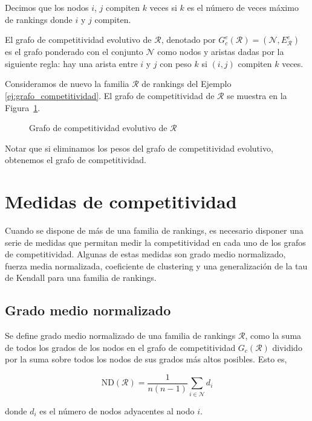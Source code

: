 \begin{defi}
Decimos que los nodos $i$, $j$ compiten $k$ veces si $k$ es el número de veces máximo de rankings donde $i$ y $j$ compiten.
\end{defi}

\begin{defi}
El grafo de competitividad evolutivo de $\mathcal{R}$, denotado por $G_c^e(\mathcal{R}) = (\mathcal{N}, E_\mathcal{R}^e)$ es el grafo ponderado con el conjunto $\mathcal{N}$ como nodos y aristas dadas por la siguiente regla: hay una arista entre $i$ y $j$ con peso $k$ si $(i,j)$ compiten $k$ veces.
\end{defi}

\begin{ejemplo}
Consideramos de nuevo la familia $\mathcal{R}$ de rankings del Ejemplo \ref{ej:grafo_competitividad}. El grafo de competitividad de $\mathcal{R}$ se muestra en la Figura~\ref{fig:grafo_competitividad_evolutivo}.

\begin{figure}[htb]
\centering
\ejemplografocompetitividadevolutivo
\caption[Grafo de competitividad evolutivo]{Grafo de competitividad evolutivo de $\mathcal{R}$}
\label{fig:grafo_competitividad_evolutivo}
\end{figure}

\end{ejemplo}

Notar que si eliminamos los pesos del grafo de competitividad evolutivo, obtenemos el grafo de competitividad.

\section{Medidas de competitividad}

Cuando se dispone de más de una familia de rankings, es necesario disponer una serie de medidas que permitan medir la competitividad en cada uno de los grafos de competitividad. Algunas de estas medidas son grado medio normalizado, fuerza media normalizada, coeficiente de clustering y una generalización de la tau de Kendall para una familia de rankings.

\subsection*{Grado medio normalizado}

\begin{defi}
Se define grado medio normalizado de una familia de rankings $\mathcal{R}$, como la suma de todos los grados de los nodos en el grafo de competitividad $G_c(\mathcal{R})$ dividido por la suma sobre todos los nodos de sus grados más altos posibles. Esto es,

\begin{equation}
\mathrm{ND}(\mathcal{R}) = \dfrac{1}{n(n-1)} \sum_{i \in \mathcal{N}} d_i
\end{equation}

donde $d_i$ es el número de nodos adyacentes al nodo  $i$.
\end{defi}

